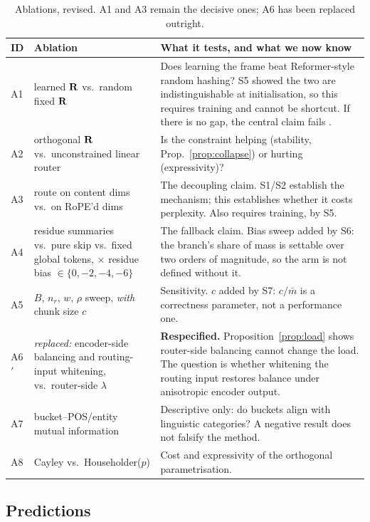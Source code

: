 \begin{table}[h]
\centering
\small
\begin{tabular}{@{}l p{4.9cm} p{6.2cm}@{}}
\toprule
\textbf{ID} & \textbf{Ablation} & \textbf{What it tests, and what we now know} \\
\midrule
A1 & learned $\mathbf{R}$ vs.\ random fixed $\mathbf{R}$ & Does learning the frame beat Reformer-style random hashing? S5 showed the two are indistinguishable at initialisation, so this requires training and cannot be shortcut. If there is no gap, the central claim fails \citep{roller2021hash}. \\
A2 & orthogonal $\mathbf{R}$ vs.\ unconstrained linear router & Is the constraint helping (stability, Prop.~\ref{prop:collapse}) or hurting (expressivity)? \\
A3 & route on content dims vs.\ on RoPE'd dims & The decoupling claim. S1/S2 establish the mechanism; this establishes whether it costs perplexity. Also requires training, by S5. \\
A4 & residue summaries vs.\ pure skip vs.\ fixed global tokens, $\times$ residue bias $\in \{0,-2,-4,-6\}$ & The fallback claim. Bias sweep added by S6: the branch's share of mass is settable over two orders of magnitude, so the arm is not defined without it. \\
A5 & $B$, $n_r$, $w$, $\rho$ sweep, \emph{with} chunk size $c$ & Sensitivity. $c$ added by S7: $c/\bar{m}$ is a correctness parameter, not a performance one. \\
A6$'$ & \emph{replaced:} encoder-side balancing and routing-input whitening, vs.\ router-side $\lambda$ & \textbf{Respecified.} Proposition~\ref{prop:load} shows router-side balancing cannot change the load. The question is whether whitening the routing input restores balance under anisotropic encoder output. \\
A7 & bucket--POS/entity mutual information & Descriptive only: do buckets align with linguistic categories? A negative result does not falsify the method. \\
A8 & Cayley vs.\ Householder($p$) & Cost and expressivity of the orthogonal parametrisation. \\
\bottomrule
\end{tabular}
\caption{Ablations, revised. A1 and A3 remain the decisive ones; A6 has been replaced outright.}
\label{tab:ablations}
\end{table}

\subsection{Predictions}

